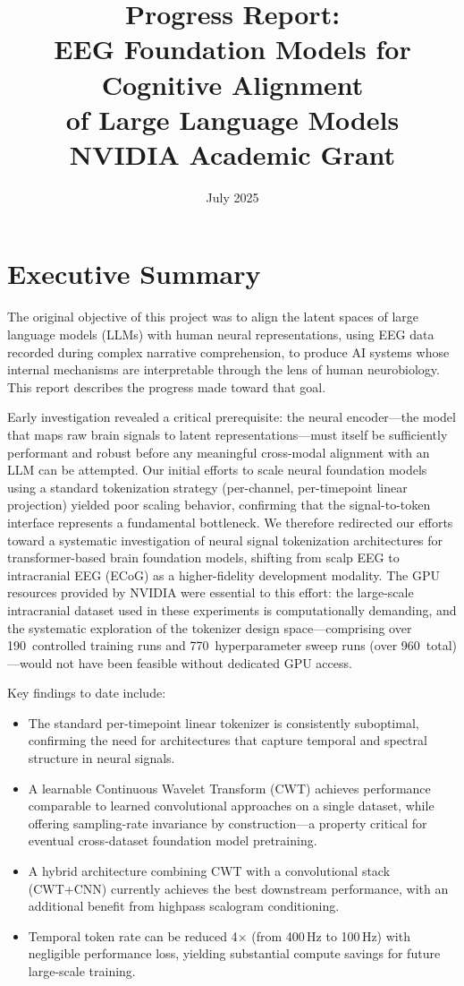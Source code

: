 \documentclass[11pt, a4paper]{article}
\title{Progress Report:\\[0.3em]
\large EEG Foundation Models for Cognitive Alignment\\
of Large Language Models\\[0.5em]
\normalsize NVIDIA Academic Grant}
\author{}
\date{July 2025}
\begin{document}
\maketitle

\section{Executive Summary}

The original objective of this project was to align the latent spaces of large language models (LLMs) with human neural representations, using EEG data recorded during complex narrative comprehension, to produce AI systems whose internal mechanisms are interpretable through the lens of human neurobiology. This report describes the progress made toward that goal.

Early investigation revealed a critical prerequisite: the neural encoder---the model that maps raw brain signals to latent representations---must itself be sufficiently performant and robust before any meaningful cross-modal alignment with an LLM can be attempted. Our initial efforts to scale neural foundation models using a standard tokenization strategy (per-channel, per-timepoint linear projection) yielded poor scaling behavior, confirming that the signal-to-token interface represents a fundamental bottleneck. We therefore redirected our efforts toward a systematic investigation of neural signal tokenization architectures for transformer-based brain foundation models, shifting from scalp EEG to intracranial EEG (ECoG) as a higher-fidelity development modality. The GPU resources provided by NVIDIA were essential to this effort: the large-scale intracranial dataset used in these experiments is computationally demanding, and the systematic exploration of the tokenizer design space---comprising over 190~controlled training runs and 770~hyperparameter sweep runs (over 960~total)---would not have been feasible without dedicated GPU access.

Key findings to date include:
\begin{itemize}[nosep]
    \item The standard per-timepoint linear tokenizer is consistently suboptimal, confirming the need for architectures that capture temporal and spectral structure in neural signals.
    \item A learnable Continuous Wavelet Transform (CWT) achieves performance comparable to learned convolutional approaches on a single dataset, while offering sampling-rate invariance by construction---a property critical for eventual cross-dataset foundation model pretraining.
    \item A hybrid architecture combining CWT with a convolutional stack (CWT+CNN) currently achieves the best downstream performance, with an additional benefit from highpass scalogram conditioning.
    \item Temporal token rate can be reduced 4$\times$ (from 400\,Hz to 100\,Hz) with negligible performance loss, yielding substantial compute savings for future large-scale training.
\end{itemize}
\end{document}
